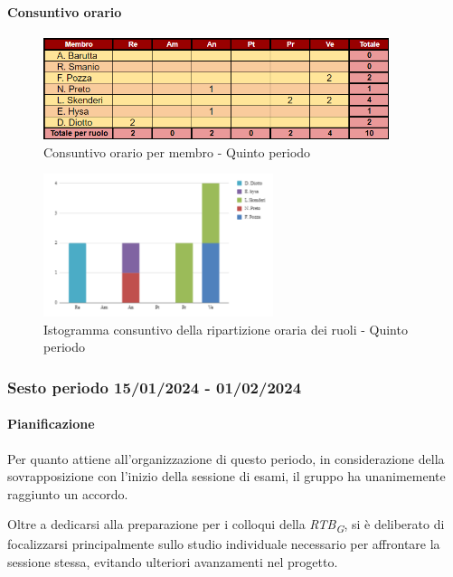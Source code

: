 \paragraph{Consuntivo orario}

\begin{figure}[H]
    \centering
    \includegraphics[width=0.9\textwidth]{../Images/consuntivoOrario5Periodo.png}
    \caption{Consuntivo orario per membro - Quinto periodo}
    \label{fig:Constuntivo_orario_5}
\end{figure}

\begin{figure}[H]
    \centering
    \includegraphics[width=0.6\textwidth]{../Images/consuntivoDivisioneRuoli5Periodo.png}
    \caption{Istogramma consuntivo della ripartizione oraria dei ruoli - Quinto periodo}
    \label{fig:Consuntivo_ripartizione_oraria_5}
\end{figure}


\subsubsection{Sesto periodo  15/01/2024 - 01/02/2024}
\paragraph{Pianificazione}
Per quanto attiene all'organizzazione di questo periodo, in considerazione della sovrapposizione con l'inizio della sessione di esami, il gruppo ha unanimemente raggiunto un accordo.

Oltre a dedicarsi alla preparazione per i colloqui della \textit{RTB}\textsubscript{\textit{G}}, si è deliberato di focalizzarsi principalmente sullo studio individuale necessario per affrontare la sessione stessa, evitando ulteriori avanzamenti nel progetto.

